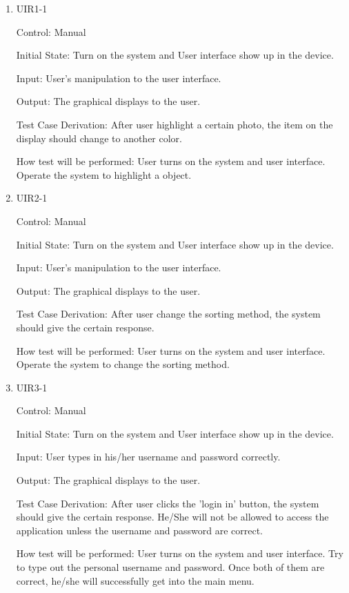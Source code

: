 \documentclass[12pt, titlepage]{article}
\begin{document}
\begin{enumerate}

\item{UIR1-1\\}

Control: Manual
					
Initial State: Turn on the system and User interface show up in the device.
					
Input: User's manipulation to the user interface.
					
Output: The graphical displays to the user.

Test Case Derivation: After user highlight a certain photo, the item on the display should change to another color.
					
How test will be performed: User turns on the system and user interface. Operate the system to highlight a object.		
	
	
\item{UIR2-1\\}

Control: Manual
					
Initial State: Turn on the system and User interface show up in the device.
					
Input: User's manipulation to the user interface.
					
Output: The graphical displays to the user.

Test Case Derivation: After user change the sorting method, the system should give the certain response.
					
How test will be performed: User turns on the system and user interface. Operate the system to change the sorting method.

\item{UIR3-1\\}

Control: Manual
					
Initial State: Turn on the system and User interface show up in the device.
					
Input: User types in his/her username and password correctly.
					
Output: The graphical displays to the user.

Test Case Derivation: After user clicks the 'login in' button, the system should give the certain response. He/She will not be allowed to access the application unless the username and password are correct.
					
How test will be performed: User turns on the system and user interface. Try to type out the personal username and password. Once both of them are correct, he/she will successfully get into the main menu.


\end{enumerate}
\end{document}
